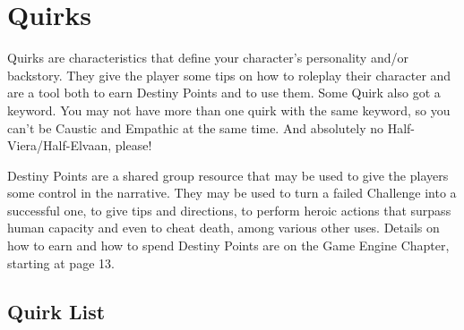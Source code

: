 \label{ch:characters}
\section{Quirks}
\label{sec:quirks}
\begin{multicols}{2}
\begin{ffcolpage}
Quirks are characteristics that define your character's personality and/or backstory. They give the player some tips on how to roleplay their character and are a tool both to earn Destiny Points and to use them. Some Quirk also got a keyword. You may not have more than one quirk with the same keyword, so you can't be Caustic and Empathic at the same time. And absolutely no Half-Viera/Half-Elvaan, please! \pc

Destiny Points are a shared group resource that may be used to give the players some control in the narrative. They may be used to turn a failed Challenge into a successful one, to give tips and directions, to perform heroic actions that surpass human capacity and even to cheat death, among various other uses. Details on how to earn and how to spend Destiny Points are on the Game Engine Chapter, starting at page 13.
\end{ffcolpage}

\subsection{Quirk List}
\label{subsec:quirklist}


\end{multicols}
